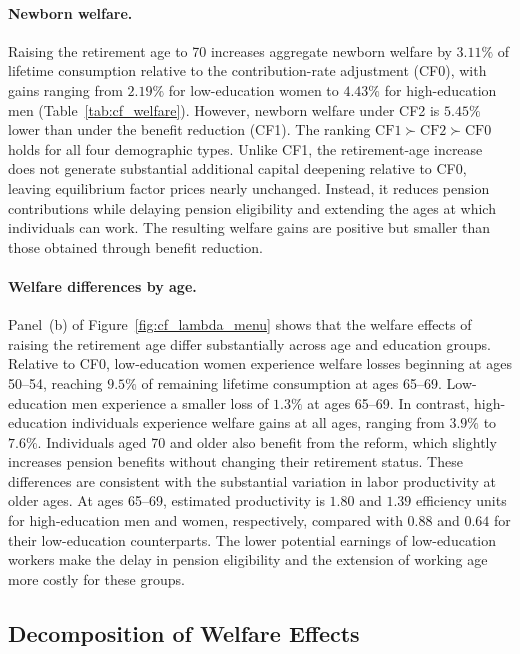 \documentclass[12pt,a4paper]{article}
\begin{document}
\paragraph{Newborn welfare.}
Raising the retirement age to 70 increases aggregate newborn welfare by $3.11\%$ of lifetime consumption relative to the contribution-rate adjustment (CF0), with gains ranging from $2.19\%$ for low-education women to $4.43\%$ for high-education men (Table~\ref{tab:cf_welfare}). However, newborn welfare under CF2 is $5.45\%$ lower than under the benefit reduction (CF1). The ranking $\mathrm{CF1}\succ\mathrm{CF2}\succ\mathrm{CF0}$ holds for all four demographic types. Unlike CF1, the retirement-age increase does not generate substantial additional capital deepening relative to CF0, leaving equilibrium factor prices nearly unchanged. Instead, it reduces pension contributions while delaying pension eligibility and extending the ages at which individuals can work. The resulting welfare gains are positive but smaller than those obtained through benefit reduction.


\paragraph{Welfare differences by age.}
Panel~(b) of Figure~\ref{fig:cf_lambda_menu} shows that the welfare effects of raising the retirement age differ substantially across age and education groups. Relative to CF0, low-education women experience welfare losses beginning at ages 50--54, reaching $9.5\%$ of remaining lifetime consumption at ages 65--69. Low-education men experience a smaller loss of $1.3\%$ at ages 65--69. In contrast, high-education individuals experience welfare gains at all ages, ranging from $3.9\%$ to $7.6\%$. Individuals aged 70 and older also benefit from the reform, which slightly increases pension benefits without changing their retirement status. These differences are consistent with the substantial variation in labor productivity at older ages. At ages 65--69, estimated productivity is $1.80$ and $1.39$ efficiency units for high-education men and women, respectively, compared with $0.88$ and $0.64$ for their low-education counterparts. The lower potential earnings of low-education workers make the delay in pension eligibility and the extension of working age more costly for these groups.

\subsection{Decomposition of Welfare Effects}
\label{subsec:cf_decomposition}
\end{document}
